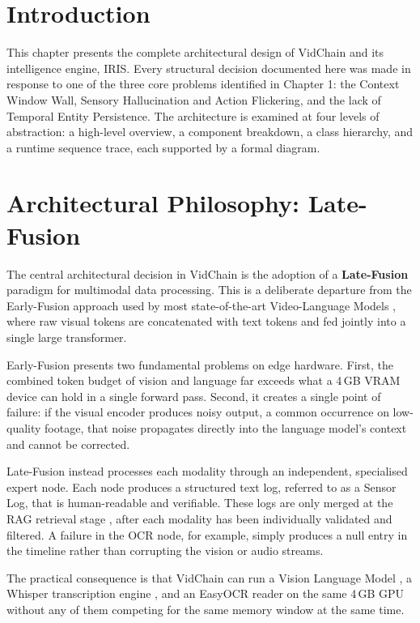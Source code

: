 \section{Introduction}

This chapter presents the complete architectural design of VidChain and its intelligence engine, IRIS. Every structural decision documented here was made in response to one of the three core problems identified in Chapter 1: the Context Window Wall, Sensory Hallucination and Action Flickering, and the lack of Temporal Entity Persistence. The architecture is examined at four levels of abstraction: a high-level overview, a component breakdown, a class hierarchy, and a runtime sequence trace, each supported by a formal diagram.

\section{Architectural Philosophy: Late-Fusion}

The central architectural decision in VidChain is the adoption of a \textbf{Late-Fusion} paradigm for multimodal data processing. This is a deliberate departure from the Early-Fusion approach used by most state-of-the-art Video-Language Models \cite{videollava}, where raw visual tokens are concatenated with text tokens and fed jointly into a single large transformer.

Early-Fusion presents two fundamental problems on edge hardware. First, the combined token budget of vision and language far exceeds what a 4\,GB VRAM device can hold in a single forward pass. Second, it creates a single point of failure: if the visual encoder produces noisy output, a common occurrence on low-quality footage, that noise propagates directly into the language model's context and cannot be corrected.

Late-Fusion instead processes each modality through an independent, specialised expert node. Each node produces a structured text log, referred to as a Sensor Log, that is human-readable and verifiable. These logs are only merged at the RAG retrieval stage \cite{rag}, after each modality has been individually validated and filtered. A failure in the OCR node, for example, simply produces a null entry in the timeline rather than corrupting the vision or audio streams.

The practical consequence is that VidChain can run a Vision Language Model \cite{moondream}, a Whisper transcription engine \cite{whisper}, and an EasyOCR reader on the same 4\,GB GPU without any of them competing for the same memory window at the same time.

